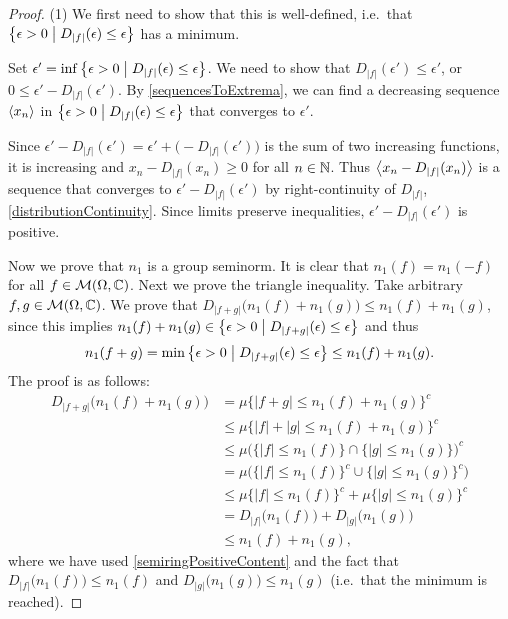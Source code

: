 \begin{proof}
(1) We first need to show that this is well-defined, i.e.\ that $\setbuilder[\big]{\epsilon > 0}{D_{|f|}(\epsilon) \leq \epsilon}$ has a minimum.

Set $\epsilon' = \inf\setbuilder[\big]{\epsilon > 0}{D_{|f|}(\epsilon) \leq \epsilon}$. We need to show that $D_{|f|}(\epsilon') \leq \epsilon'$, or $0 \leq \epsilon'- D_{|f|}(\epsilon')$. By \ref{sequencesToExtrema}, we can find a decreasing sequence $\left\langle x_n \right\rangle$ in $\setbuilder[\big]{\epsilon > 0}{D_{|f|}(\epsilon) \leq \epsilon}$ that converges to $\epsilon'$.

Since $\epsilon'- D_{|f|}(\epsilon') = \epsilon' + \big(- D_{|f|}(\epsilon')\big)$ is the sum of two increasing functions, it is increasing and $x_n- D_{|f|}(x_n) \geq 0$ for all $n\in \mathbb{N}$. Thus $\left\langle x_n- D_{|f|}(x_n) \right\rangle$ is a sequence that converges to $\epsilon'- D_{|f|}(\epsilon')$ by right-continuity of $D_{|f|}$, \ref{distributionContinuity}. Since limits preserve inequalities, $\epsilon'- D_{|f|}(\epsilon')$ is positive.

Now we prove that $n_1$ is a group seminorm. It is clear that $n_1(f) = n_1(-f)$ for all $f\in\operatorname{\mathcal{M}}(\Omega, \mathbb{C})$. Next we prove the triangle inequality. Take arbitrary $f,g\in \operatorname{\mathcal{M}}(\Omega, \mathbb{C})$. We prove that $D_{|f+g|}\big(n_1(f) + n_1(g)\big) \leq n_1(f) + n_1(g)$, since this implies $n_1(f) + n_1(g) \in \setbuilder[\big]{\epsilon > 0}{D_{|f+g|}(\epsilon) \leq \epsilon}$ and thus
\[ n_1(f+g) = \min\setbuilder[\big]{\epsilon > 0}{D_{|f+g|}(\epsilon) \leq \epsilon} \leq n_1(f) + n_1(g). \]
The proof is as follows:
\begin{align*}
D_{|f+g|}\big(n_1(f) + n_1(g)\big) &= \mu\{|f+g| \leq n_1(f) + n_1(g)\}^c \\
&\leq \mu\{|f|+|g| \leq n_1(f) + n_1(g)\}^c \\
&\leq \mu\big(\{|f| \leq n_1(f)\} \cap \{|g| \leq n_1(g)\}\big)^c \\
&= \mu\big(\{|f| \leq n_1(f)\}^c \cup \{|g| \leq n_1(g)\}^c\big) \\
&\leq \mu\{|f| \leq n_1(f)\}^c + \mu\{|g| \leq n_1(g)\}^c \\
&= D_{|f|}\big(n_1(f)\big) + D_{|g|}\big(n_1(g)\big) \\
&\leq n_1(f) + n_1(g),
\end{align*}
where we have used \ref{semiringPositiveContent} and the fact that $D_{|f|}\big(n_1(f)\big)\leq n_1(f)$ and $D_{|g|}\big(n_1(g)\big)\leq n_1(g)$ (i.e.\ that the minimum is reached).
\end{proof}


